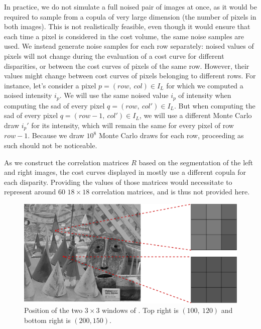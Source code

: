 In practice, we do not simulate a full noised pair of images at once, as it would be required to sample from a copula of very large dimension (the number of pixels in both images). This is not realistically feasible, even though it would ensure that each time a pixel is considered in the cost volume, the same noise samples are used. We instead generate noise samples for each row separately: noised values of pixels will not change during the evaluation of a cost curve for different disparities, or between the cost curves of pixels of the same row. However, their values might change between cost curves of pixels belonging to different rows. For instance, let's consider a pixel $p=(row,~col)\in I_L$ for which we computed a noised intensity $i_p$. We will use the same noised value $i_p$ of intensity when computing the \acrshort{sad} of every pixel $q=(row,~col')\in I_L$. But when computing the \acrshort{sad} of every pixel $q=(row-1,~col')\in I_L$, we will use a different Monte Carlo draw $i_p'$ for its intensity, which will remain the same for every pixel of row $row-1$. Because we draw $10^8$ Monte Carlo draws for each row, proceeding as such should not be noticeable. 

\begin{remark}
    As we construct the correlation matrices $R$ based on the segmentation of the left and right images, the cost curves displayed in  mostly use a different copula for each disparity. Providing the values of those matrices would necessitate to represent around $60$ $18\times18$ correlation matrices, and is thus not provided here.
\end{remark}

\begin{figure}
    \centering
    \includegraphics[width=0.8\linewidth]{Images/Chap_4/cones_with_two_windows.png}
    \caption{Position of the two $3\times3$ windows of . Top right is $(100,~120)$ and bottom right is $(200, 150)$.}
    \label{fig:cones_with_two_windows}
\end{figure}

